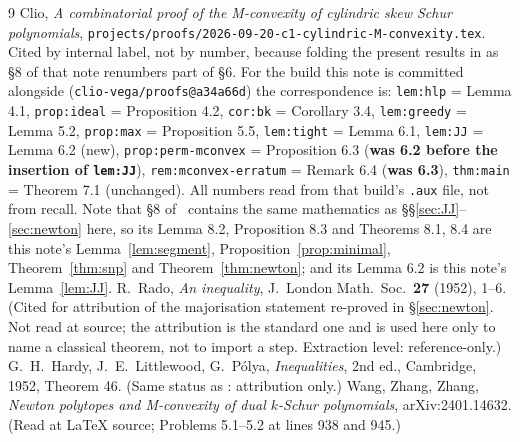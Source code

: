 \documentclass[11pt]{article}
\theoremstyle{plain}
\theoremstyle{definition}
\begin{document}
\begin{thebibliography}{9}
 Clio, \emph{A combinatorial proof of the M-convexity of
cylindric skew Schur polynomials}, \texttt{projects/proofs/2026-09-20-c1-cylindric-M-convexity.tex}.
Cited by internal label, not by number, because folding the present results in
as \S8 of that note renumbers part of \S6. For the build this note is committed alongside
(\texttt{clio-vega/proofs@a34a66d}) the correspondence is: \texttt{lem:hlp} = Lemma 4.1,
\texttt{prop:ideal} = Proposition 4.2, \texttt{cor:bk} = Corollary 3.4, \texttt{lem:greedy} =
Lemma 5.2, \texttt{prop:max} = Proposition 5.5, \texttt{lem:tight} = Lemma 6.1, \texttt{lem:JJ} =
Lemma 6.2 (new), \texttt{prop:perm-mconvex} = Proposition 6.3 (\textbf{was 6.2 before the
insertion of \texttt{lem:JJ}}), \texttt{rem:mconvex-erratum} = Remark 6.4 (\textbf{was 6.3}),
\texttt{thm:main} = Theorem 7.1 (unchanged). All numbers read from that build's \texttt{.aux}
file, not from recall. Note that \S8 of~\cite{note1} contains the same mathematics as
\S\S\ref{sec:JJ}--\ref{sec:newton} here, so its Lemma 8.2, Proposition 8.3 and Theorems 8.1, 8.4
are this note's Lemma~\ref{lem:segment}, Proposition~\ref{prop:minimal},
Theorem~\ref{thm:snp} and Theorem~\ref{thm:newton}; and its Lemma 6.2 is this note's
Lemma~\ref{lem:JJ}.
 R.~Rado, \emph{An inequality}, J.\ London Math.\ Soc.\ \textbf{27}
(1952), 1--6. (Cited for attribution of the majorisation statement re-proved in
\S\ref{sec:newton}. Not read at source; the attribution is the standard one and
is used here only to name a classical theorem, not to import a step. Extraction
level: reference-only.)
 G.~H.~Hardy, J.~E.~Littlewood, G.~P\'olya, \emph{Inequalities},
2nd ed., Cambridge, 1952, Theorem 46. (Same status as \cite{Rado}:
attribution only.)
 Wang, Zhang, Zhang, \emph{Newton polytopes and M-convexity of dual
$k$-Schur polynomials}, arXiv:2401.14632. (Read at LaTeX source; Problems
5.1--5.2 at lines 938 and 945.)
\end{thebibliography}
\end{document}
